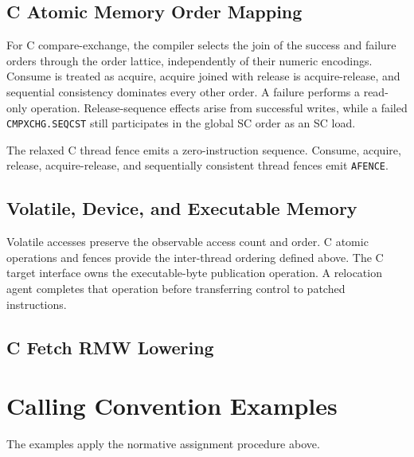\documentclass[10pt,twoside]{article}
\begin{document}
\BedrockGeneratedCAtomicPrimitiveTable

\Needspace{2.6in}
\subsection{C Atomic Memory Order Mapping}
\BedrockGeneratedCMemoryOrderTable

For C compare-exchange, the compiler selects the join of the success and
failure orders through the order lattice, independently of their numeric encodings. Consume is
treated as acquire, acquire joined with release is acquire-release, and
sequential consistency dominates every other order. A failure performs a
read-only operation. Release-sequence effects arise from successful writes,
while a failed
\texttt{CMPXCHG.SEQCST} still participates in the global SC order as an SC
load.

The relaxed C thread fence emits a zero-instruction sequence. Consume,
acquire, release, acquire-release, and sequentially consistent thread fences
emit \texttt{AFENCE}.

\subsection{Volatile, Device, and Executable Memory}
Volatile accesses preserve the observable access count and order. C atomic
operations and fences provide the inter-thread ordering defined above.
The C target interface owns the executable-byte publication operation. A
relocation agent completes that operation before transferring control to
patched instructions.

\Needspace{2.0in}
\subsection{C Fetch RMW Lowering}
\BedrockGeneratedCFetchRMWTable

\clearpage
\section{Calling Convention Examples}\label{page:calling-convention-examples}
The examples apply the normative assignment procedure above.
\end{document}
